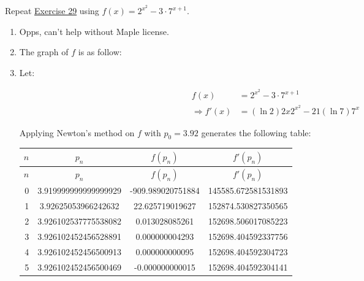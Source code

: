\documentclass[../../../../Assignments]{subfiles}
\begin{document}
\begin{exercise}
    Repeat \hyperref[exer:2.3.29]{Exercise 29} using \(f(x) = 2^{x^2} - 3 \cdot
    7^{x + 1}\).
\end{exercise}

\begin{solution}
    \begin{enumerate}[label = \alph*)]
        \item Opps, can't help without Maple license.

        \item The graph of \(f\) is as follow:

            \begin{figure}[H]
                \centering
                \begingroup
                    
                \endgroup
            \end{figure}

        \item Let:

            \begin{align*}
                             f(x) &= 2^{x^2} - 3 \cdot 7^{x + 1} \\
                \Rightarrow f'(x) &= (\ln{2}) 2x 2^{x^2} - 21 (\ln{7}) 7^x
            \end{align*}

            Applying Newton's method on \(f\) with \(p_0 = \num{3.92}\)
            generates the following table:

            \begin{longtable}{r S[table-format=1.18] S[table-format=-3.12] S[table-format=6.12]}
                \toprule
                \(n\)  &        {\(p_n\)}       &     {\(f(p_n)\)}    &     {\(f'(p_n)\)}     \\
                \midrule
                \endfirsthead
                \(n\)  &        {\(p_n\)}       &     {\(f(p_n)\)}    &     {\(f'(p_n)\)}     \\
                \midrule
                  &  3.919999999999999929  &  -909.989020751884  &  145585.672581531893  \\
                    1  &  3.92625053966242632   &    22.625719019627  &  152874.530827350565  \\
                    2  &  3.926102537775538082  &     0.013028085261  &  152698.506017085223  \\
                    3  &  3.926102452456528891  &     0.000000004293  &  152698.404592337756  \\
                    4  &  3.926102452456500913  &     0.000000000095  &  152698.404592304723  \\
                    5  &  3.926102452456500469  &    -0.000000000015  &  152698.404592304141  \\
                \bottomrule
            \end{longtable}


\end{enumerate}
\end{solution}
\end{document}
